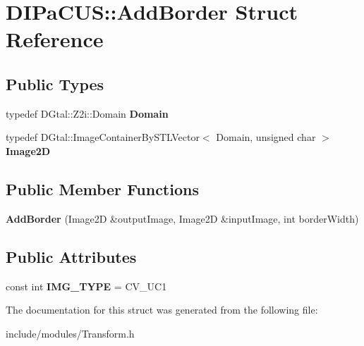 \hypertarget{structDIPaCUS_1_1AddBorder}{}\section{D\+I\+Pa\+C\+US\+:\+:Add\+Border Struct Reference}
\label{structDIPaCUS_1_1AddBorder}
\subsection*{Public Types}
\begin{DoxyCompactItemize}
\item 
\mbox{\label{structDIPaCUS_1_1AddBorder_a338ce60ac1d7e6f67530ae0e80cf8338}} 
typedef D\+Gtal\+::\+Z2i\+::\+Domain {\bfseries Domain}
\item 
\mbox{\label{structDIPaCUS_1_1AddBorder_a1a5bb60d046d0638618e459278c47186}} 
typedef D\+Gtal\+::\+Image\+Container\+By\+S\+T\+L\+Vector$<$ Domain, unsigned char $>$ {\bfseries Image2D}
\end{DoxyCompactItemize}
\subsection*{Public Member Functions}
\begin{DoxyCompactItemize}
\item 
\mbox{\label{structDIPaCUS_1_1AddBorder_a3d3185c77ce29d84809377df185a754d}} 
{\bfseries Add\+Border} (Image2D \&output\+Image, Image2D \&input\+Image, int border\+Width)
\end{DoxyCompactItemize}
\subsection*{Public Attributes}
\begin{DoxyCompactItemize}
\item 
\mbox{\label{structDIPaCUS_1_1AddBorder_a2cc8322b2deae2293e31a2d0848894b6}} 
const int {\bfseries I\+M\+G\+\_\+\+T\+Y\+PE} = C\+V\+\_\+U\+C1
\end{DoxyCompactItemize}


The documentation for this struct was generated from the following file\+:\begin{DoxyCompactItemize}
\item 
include/modules/Transform.\+h\end{DoxyCompactItemize}
